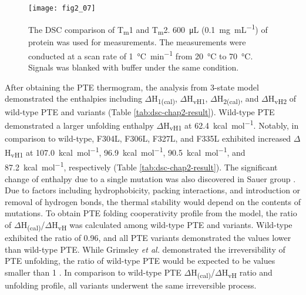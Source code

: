 \begin{refsection}
\begin{figure}[htbp] \centering \texttt{[image: fig2\_07]}
    \caption[The DSC comparison of T\textsubscript{m}1 and T\textsubscript{m}2.
    \SI{600}{\micro\L} (\SI{0.1}{\mg\per\mL}) of protein was used for
    measurements. The measurements were conducted at a scan rate of
    \SI{1}{\celsius\per\minute} from \SI{20}{\celsius} to \SI{70}{\celsius}.
    Signals was blanked with buffer under the same condition.]{The DSC
        comparison of T\textsubscript{m}1 and T\textsubscript{m}2.
        \SI{600}{\micro\L} (\SI{0.1}{\mg\per\mL}) of protein was used for
        measurements. The measurements were conducted at a scan rate of
        \SI{1}{\celsius\per\minute} from \SI{20}{\celsius} to
        \SI{70}{\celsius}.  Signals was blanked with buffer under the same
    condition.} 
    \label{fig:dsc-chap2-result}
\end{figure}

After obtaining the PTE thermogram, the analysis from 3-state model
demonstrated the enthalpies including $\Delta$H\textsubscript{1(cal)},
$\Delta$H\textsubscript{vH1}, $\Delta$H\textsubscript{2(cal)}, and
$\Delta$H\textsubscript{vH2} of wild-type PTE and variants (Table
\ref{tab:dsc-chap2-result}). Wild-type PTE demonstrated a larger unfolding enthalpy
$\Delta$H\textsubscript{vH1} at \SI{62.4}{kcal\per\mole}. Notably, in
comparison to wild-type, F304L, F306L, F327L, and F335L exhibited increased
$\Delta$H\textsubscript{vH1} at \SI{107.0}{kcal\per\mole},
\SI{96.9}{kcal\per\mole}, \SI{90.5}{kcal\per\mole}, and
\SI{87.2}{kcal\per\mole}, respectively (Table \ref{tab:dsc-chap2-result}). The
significant change of enthalpy due to a single mutation was also discovered in
Sauer group \cite{Hecht1984a}. Due to factors including hydrophobicity, packing
interactions, and introduction or removal of hydrogen bonds, the thermal
stability would depend on the contents of mutations. To obtain PTE folding
cooperativity profile from the model, the ratio of
$\Delta$H\textsubscript{(cal)}/$\Delta$H\textsubscript{vH} was calculated among
wild-type PTE and variants. Wild-type exhibited the ratio of 0.96, and all PTE
variants demonstrated the values lower than wild-type PTE. While Grimsley
\emph{et al.} demonstrated the irreversibility of PTE unfolding, the ratio of
wild-type PTE would be expected to be values smaller than
1 \cite{Grimsley1997b,Privalov2009,Honda2000,Sancho2013}. In comparison to
wild-type PTE $\Delta$H\textsubscript{(cal)}/$\Delta$H\textsubscript{vH} ratio
and unfolding profile, all variants underwent the same irreversible
process.


\end{refsection}
